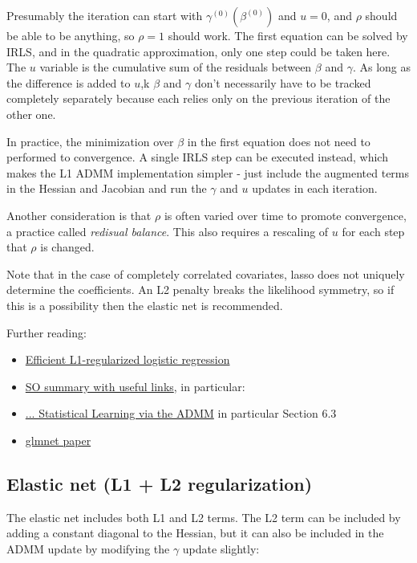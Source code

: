 \documentclass{article}
\begin{document}
Presumably the iteration can start with \(\gamma^{(0)}(\beta^{(0)})\) and \(u = 0\), and
\(\rho\) should be able to be anything, so \(\rho=1\) should work. The
first equation can be solved by IRLS, and in the quadratic approximation, only
one step could be taken here. The \(u\) variable is the cumulative sum of the
residuals between \(\beta\) and \(\gamma\). As long as the difference is
added to \(u\),k \(\beta\) and \(\gamma\) don't necessarily have to be
tracked completely separately because each relies only on the previous
iteration of the other one.

In practice, the minimization over \(\beta\) in the first equation does not
need to performed to convergence. A single IRLS step can be executed instead,
which makes the L1 ADMM implementation simpler - just include the augmented
terms in the Hessian and Jacobian and run the \(\gamma\) and \(u\) updates
in each iteration.

Another consideration is that \(\rho\) is often varied over time to promote
convergence, a practice called \emph{redisual balance}. This also requires a
rescaling of \(u\) for each step that \(\rho\) is changed.

Note that in the case of completely correlated covariates, lasso does not
uniquely determine the coefficients. An L2 penalty breaks the likelihood
symmetry, so if this is a possibility then the elastic net is recommended.

Further reading:
\begin{itemize}
\item \href{https://www.andrewng.org/publications/efficient-l1-regularized-logistic-regression/}{Efficient L1-regularized logistic regression}
\item \href{https://math.stackexchange.com/a/3608432}{SO summary with useful links}, in particular:
\item \href{https://web.stanford.edu/~boyd/papers/pdf/admm_distr_stats.pdf}{... Statistical Learning via the ADMM} in particular Section 6.3
\item \href{https://www.ncbi.nlm.nih.gov/pmc/articles/PMC2929880/}{glmnet paper}
\end{itemize}

\subsection{Elastic net (L1 + L2 regularization)}

The elastic net includes both L1 and L2 terms. The L2 term can be included by
adding a constant diagonal to the Hessian, but it can also be included in the
ADMM update by modifying the \(\gamma\) update slightly:
\end{document}
